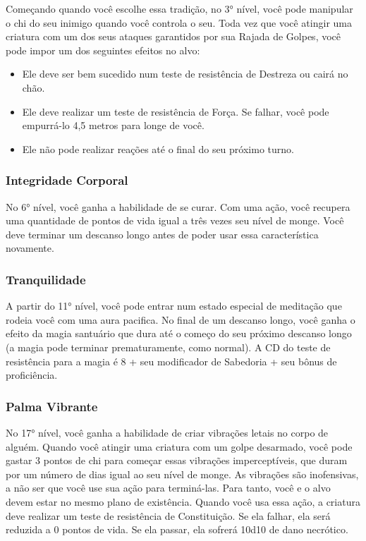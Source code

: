 \begin{multicols}{2}
Começando quando você escolhe essa tradição, no 3° nível, você pode manipular o
chi do seu inimigo quando você controla o seu. Toda vez que você atingir uma
criatura com um dos seus ataques garantidos por sua Rajada de Golpes, você pode
impor um dos seguintes efeitos no alvo:

\begin{itemize}
    \item Ele deve ser bem sucedido num teste de resistência de Destreza ou
        cairá no chão.
    \item Ele deve realizar um teste de resistência de Força. Se falhar, você
        pode empurrá-lo 4,5 metros para longe de você.
    \item Ele não pode realizar reações até o final do seu próximo turno.
\end{itemize}

\subsubsection*{Integridade Corporal}%
\label{ssub:integridade_corporal}

No 6° nível, você ganha a habilidade de se curar. Com uma ação, você recupera
uma quantidade de pontos de vida igual a três vezes seu nível de monge. Você
deve terminar um descanso longo antes de poder usar essa característica
novamente.

\subsubsection*{Tranquilidade}%
\label{ssub:tranquilidade}

A partir do 11° nível, você pode entrar num estado especial de meditação que
rodeia você com uma aura pacifica. No final de um descanso longo, você ganha o
efeito da magia santuário que dura até o começo do seu próximo descanso longo (a
magia pode terminar prematuramente, como normal). A CD do teste de resistência
para a magia é 8 + seu modificador de Sabedoria + seu bônus de proficiência.

\subsubsection*{Palma Vibrante}%
\label{ssub:palma_vibrante}

No 17° nível, você ganha a habilidade de criar vibrações letais no corpo de
alguém. Quando você atingir uma criatura com um golpe desarmado, você pode
gastar 3 pontos de chi para começar essas vibrações imperceptíveis, que duram
por um número de dias igual ao seu nível de monge. As vibrações são inofensivas,
a não ser que você use sua ação para terminá-las. Para tanto, você e o alvo
devem estar no mesmo plano de existência. Quando você usa essa ação, a criatura
deve realizar um teste de resistência de Constituição. Se ela falhar, ela será
reduzida a 0 pontos de vida. Se ela passar, ela sofrerá 10d10 de dano
necrótico.


\end{multicols}
